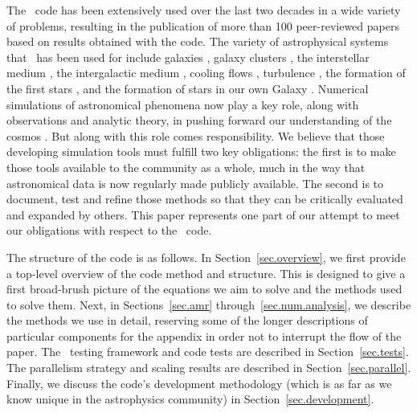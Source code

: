 The \enzo\ code has been extensively used over the last two decades in a wide variety of problems, resulting in the publication of more than 100 peer-reviewed papers based on results obtained with the code. The variety of astrophysical systems that \enzo\ has been used for include galaxies \citep{2003ApJ...587...13T, 2012ApJ...749..140H}, galaxy clusters \citep{Loken02, Skillman13}, the interstellar medium \citep{Slyz05}, the intergalactic medium \citep{Fang01, 2011ApJ...731....6S}, cooling flows \citep{Li12, 2013ApJ...763...38S}, turbulence \citep{Kritsuk04, 2009JPhCS.180a2020K, Collins11}, the formation of the first stars \citep{ABN02, 2007ApJ...654...66O, 2009Sci...325..601T}, and the formation of stars in our own Galaxy \citep{Collins12a}.
Numerical simulations of astronomical phenomena now play a key role, along with observations and analytic theory, in pushing forward our understanding of the cosmos \citep[e.g.,][]{DecadalSurvey01, DecadalSurvey10}.   But along with this role comes responsibility.  We believe that those developing simulation tools must fulfill two key obligations: the first is to make those tools available to the community as a whole, much in the way that astronomical data is now regularly made publicly available.  The second is to document, test and refine those methods so that they can be critically evaluated and expanded by others.  This paper represents one part of our attempt to meet our obligations with respect to the \enzo\ code.

The structure of the code is as follows.  In Section~\ref{sec.overview}, we first provide a top-level overview of the code method and structure.  This is designed to give a first broad-brush picture of the equations we aim to solve and the methods used to solve them.  Next, in Sections~\ref{sec.amr} through~\ref{sec.num.analysis}, we describe the methods we use in detail, reserving some of the longer descriptions of particular components for the appendix in order not to interrupt the flow of the paper.  The \enzo\ testing framework and code tests are described in Section~\ref{sec.tests}.  The parallelism strategy and scaling results are described in Section~\ref{sec.parallel}.  Finally, we discuss the code's development methodology (which is as far as we know unique in the astrophysics community) in Section~\ref{sec.development}.

